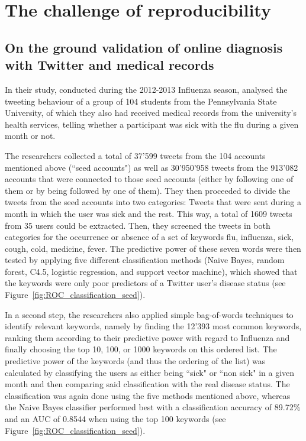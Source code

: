 \documentclass[11pt, a4paper,twoside]{report}\usepackage[]{graphicx}\usepackage[]{color}
\begin{document}
\chapter{The challenge of reproducibility}
\label{ch:reproducibility}
\section{On the ground validation of online diagnosis with Twitter and medical records}
\label{sec:on_the_ground}
In their study, conducted during the 2012-2013 Influenza season, \cite{bodnar_ground_2014} analysed the tweeting behaviour of a group of 104 students from the Pennsylvania State University, of which they also had received medical records from the university's health services, telling whether a participant was sick with the flu during a given month or not.\newline

The researchers collected a total of 37'599 tweets from the 104 accounts mentioned above (``seed accounts") as well as 30'950'958 tweets from the 913'082 accounts that were connected to those seed accounts (either by following one of them or by being followed by one of them). They then proceeded to divide the tweets from the seed accounts into two categories: Tweets that were sent during a month in which the user was sick and the rest. This way, a total of 1609 tweets from 35 users could be extracted. 
Then, they screened the tweets in both categories for the occurrence or absence of a set of keywords {flu, influenza, sick, cough, cold, medicine, fever}. The predictive power of these seven words were then tested by applying five different classification methods (Naive Bayes, random forest, C4.5, logistic regression, and support vector machine), which showed that the keywords were only poor predictors of a Twitter user's disease status (see Figure~\ref{fig:ROC_classification_seed}).\newline

In a second step, the researchers also applied simple bag-of-words techniques to identify relevant keywords, namely by finding the 12'393 most common keywords, ranking them according to their predictive power with regard to Influenza and finally choosing the top 10, 100, or 1000 keywords on this ordered list. The predictive power of the keywords (and thus the ordering of the list) was calculated by classifying the users as either being ``sick" or ``non sick" in a given month and then comparing said classification with the real disease status. The classification was again done using the five methods mentioned above, whereas the Naive Bayes classifier performed best with a classification accuracy of 89.72\% and an AUC of 0.8544 when using the top 100 keywords (see Figure~\ref{fig:ROC_classification_seed}).
\end{document}
